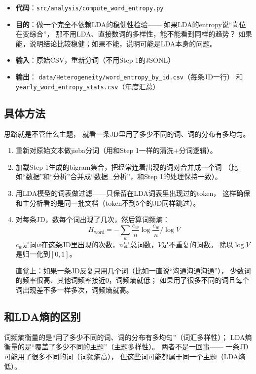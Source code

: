 \documentclass[12pt,a4paper]{ctexart}
\begin{document}
\begin{itemize}[leftmargin=2em]
\item \textbf{代码}：\texttt{src/analysis/compute\_word\_entropy.py}
\item \textbf{目的}：做一个完全不依赖LDA的稳健性检验——
如果LDA的entropy说``岗位在变综合''，
那不用LDA、直接数词的多样性，能不能看到同样的趋势？
如果能，说明结论比较稳健；如果不能，说明可能是LDA本身的问题。
\item \textbf{输入}：原始CSV，重新分词（不用Step 1的JSONL）
\item \textbf{输出}：
\texttt{data/Heterogeneity/word\_entropy\_by\_id.csv}（每条JD一行）
和 \texttt{yearly\_word\_entropy\_stats.csv}（年度汇总）
\end{itemize}

\subsection{具体方法}

思路就是不管什么主题，
就看一条JD里用了多少不同的词、词的分布有多均匀。

\begin{enumerate}
\item 重新对原始文本做jieba分词（用和Step 1一样的清洗+分词逻辑）。
\item 加载Step 1生成的bigram集合，把经常连着出现的词对合并成一个词
（比如``数据''和``分析''合并成``数据\_分析''，和Step 1的处理保持一致）。
\item 用LDA模型的词表做过滤——只保留在LDA词表里出现过的token，
这样确保和主分析看的是同一批文档（token不到5个的JD同样跳过）。
\item 对每条JD，数每个词出现了几次，然后算词频熵：
\[
H_{\text{word}} = -\sum_{w} \frac{c_w}{n} \log \frac{c_w}{n} \bigg/ \log V
\]
$c_w$是词$w$在这条JD里出现的次数，$n$是总词数，$V$是不重复的词数。
除以$\log V$是归一化到$[0,1]$。

直觉上：如果一条JD反复只用几个词（比如一直说``沟通沟通沟通''），
少数词的频率很高、其他词频率接近0，词频熵就低；
如果用了很多不同的词且每个词出现差不多一样多次，词频熵就高。
\end{enumerate}

\subsection{和LDA熵的区别}

词频熵衡量的是``用了多少不同的词、词的分布有多均匀''（词汇多样性）；
LDA熵衡量的是``覆盖了多少不同的主题''（主题多样性）。
两者不是一回事——
一条JD可能用了很多不同的词（词频熵高），
但这些词可能都属于同一个主题（LDA熵低）。
\end{document}
